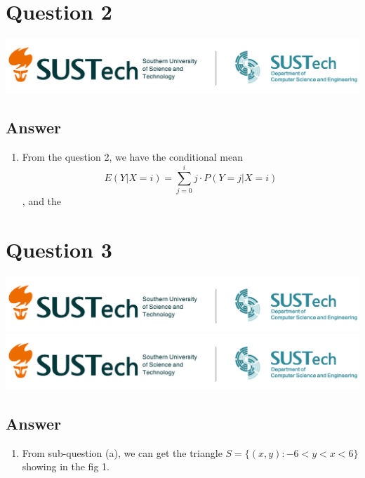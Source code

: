 \documentclass[
	12pt, %
]{fphw}
\begin{document}
\section*{Question 2}
\begin{problem}
	\includegraphics[width=440pt]{img/logo.png}
\end{problem}
\subsection*{Answer}
\begin{enumerate} %
	\item From the question 2, we have the conditional mean $$E(Y|X=i)=\sum_{j=0}^i j\cdot P(Y=j|X=i)$$, and the
\end{enumerate}
\clearpage

\section*{Question 3}
\begin{problem}
    \includegraphics[width=440pt]{img/logo.png}\\ %
    \includegraphics[width=440pt]{img/logo.png}
\end{problem}
\subsection*{Answer} 
\begin{enumerate}
    \item From sub-question (a), we can get the triangle $S=\{(x,y):-6<y<x<6\}$ showing in the fig 1. 
\end{enumerate}
\clearpage
\end{document}
